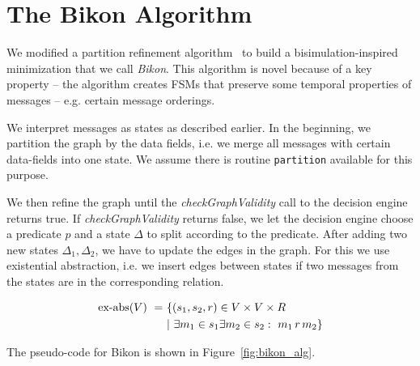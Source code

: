 \newtheorem*{definition}{Definition}
\newcommand{\goesto}[1]{\ensuremath{\stackrel{#1}{\rightarrow}}}
\newcommand{\Act}{\ensuremath{A}}

\section{The Bikon Algorithm}
\label{sec:bisimulation}

We modified a partition refinement algorithm~\cite{PartRefine} to
build a bisimulation-inspired minimization that we call \emph{Bikon}.
This algorithm is novel because of a key property -- the algorithm
creates FSMs that preserve some temporal properties of messages --
e.g. certain message orderings.


We interpret messages as states as described earlier. In the beginning, we partition
the graph by the data fields, i.e. we merge all messages with certain data-fields into one state.
We assume there is routine \texttt{partition} available for this purpose.

We then refine the graph until the \textit{checkGraphValidity} call to
the decision engine returns true. If \textit{checkGraphValidity} returns false, we
let the decision engine choose a predicate $p$ and a state
$\Delta$ to split according to the predicate. After adding two new states 
$\Delta_1,\Delta_2$, we have to update the edges in the graph. 
For this we use existential abstraction, i.e. we insert edges between states if 
two messages from the states are in the corresponding relation.

\begin{align*}
\textup{ex-abs}(V)~=~&\{(s_1,s_2,r)\in{V\times{V}\times{R}}~\\
&|~\exists{m_1}\in{s_1}\exists{m_2}\in{s_2}:~m_1\,r\, m_2\}
\end{align*}

The pseudo-code for Bikon is shown in Figure~\ref{fig:bikon_alg}.



